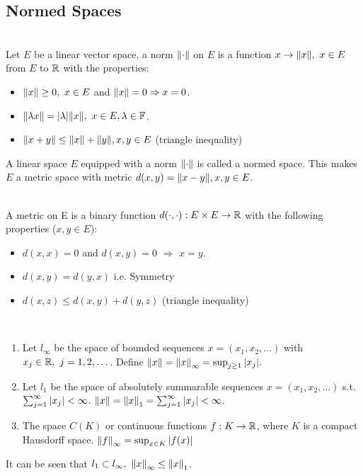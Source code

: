 \subsection{Normed Spaces}
\begin{definition}\ \\
Let $E$ be a linear vector space, a norm $\norm{\cdot}$ on $E$ is a function $x \to \norm{x},\ x \in E$ from $E$ to $\mathbb{R}$ with the properties:
\begin{itemize}
    \item $\norm{x} \geq 0,\ x \in E$ and $\norm{x} = 0 \Rightarrow x = 0$.
    \item $\norm{\lambda x} = \abs{\lambda} \norm{x},\ x \in E, \lambda \in \mathbb{F}$.
    \item $\norm{x + y} \leq \norm{x} + \norm{y}, x,y \in E$ (triangle inequality) 
\end{itemize}
\end{definition}
\np A linear space $E$ equipped with a norm $\norm{\cdot}$ is called a normed space. This makes $E$ a metric space with metric $d(x,y) = \norm{x -y}, x,y \in E$.
\begin{definition}\ \\
A metric on E is a binary function $d(\cdot, \cdot): E \times E \to \mathbb{R}$ with the following properties ($x,y \in E$):
\begin{itemize}
    \item $d(x,x) = 0$ and $d(x,y) = 0$ $\Rightarrow$ $x = y$.
    \item $d(x,y) = d(y,x)$ i.e. Symmetry
    \item $d(x,z) \leq d(x,y) + d(y,z)$ (triangle inequality)
\end{itemize}
\end{definition}
\begin{examples}\ 
\begin{enumerate}[label = (\alph*)]
    \item Let $l_\infty$ be the space of bounded sequences $x = (x_1,x_2,\dots)$ with $x_j \in \mathbb{R},\ j = 1,2,\dots$. Define $\norm{x} = \norm{x}_\infty = \sup_{j \geq 1} \abs{x_j}.$
    \item Let $l_1$ be the space of absolutely summarable sequences $x = (x_1,x_2,\dots)$ s.t. $\sum_{j=1}^\infty \abs{x_j} < \infty$. $\norm{x} = \norm{x}_1 = \sum_{j = 1}^\infty \abs{x_j} < \infty$.
    \item The space $C(K)$ or continuous functions $f: K \to \mathbb{R}$, where $K$ is a compact Hausdorff space. $\norm{f}_\infty = \sup_{x \in K} \abs{f(x)}$
\end{enumerate}
It can be seen that $l_1 \subset l_\infty,\ \norm{x}_\infty \leq \norm{x}_1$.
\end{examples}

